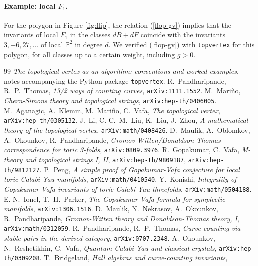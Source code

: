 \documentclass[11pt]{article}
\newcommand{\PP}{\mathbb{P}}
\newcommand{\topvertex}{\texttt{topvertex}}
\begin{document}
\paragraph{Example: local $F_1$.} For the polygon in Figure \ref{fig:flip}, the relation
(\ref{flop-gv}) implies that the invariants of local $F_1$ in the classes $dB+dF$ coincide with
the invariants $3,-6,27,\ldots$ of local $\PP^2$ in degree $d$. We verified (\ref{flop-gv}) with
\topvertex{} for this polygon, for all classes up to a certain weight, including $g>0$.

{\footnotesize
\begin{thebibliography}{99}\setlength{\itemsep}{-2pt}\setlength{\parsep}{0pt}
 \textit{The topological vertex as an algorithm: conventions and worked examples},
notes accompanying the Python package \texttt{topvertex}.
 R.~Pandharipande, R.~P.~Thomas, \textit{13/2 ways of counting curves},
\texttt{arXiv:1111.1552}.
 M.~Mari\~no, \textit{Chern-Simons theory and topological strings},
\texttt{arXiv:hep-th/0406005}.
 M.~Aganagic, A.~Klemm, M.~Mari\~no, C.~Vafa, \textit{The topological vertex},
\texttt{arXiv:hep-th/0305132}.
 J.~Li, C.-C.~M.~Liu, K.~Liu, J.~Zhou, \textit{A mathematical theory of the
topological vertex},
\texttt{arXiv:math/0408426}.
 D.~Maulik, A.~Oblomkov, A.~Okounkov, R.~Pandharipande,
\textit{Gromov-Witten/Donaldson-Thomas correspondence for toric 3-folds},
\texttt{arXiv:0809.3976}.
 R.~Gopakumar, C.~Vafa, \textit{M-theory and topological strings I, II},
\texttt{arXiv:hep-th/9809187}, \texttt{arXiv:hep-th/9812127}.
 P.~Peng, \textit{A simple proof of Gopakumar-Vafa conjecture for local toric
Calabi-Yau manifolds},
\texttt{arXiv:math/0410540}.
 Y.~Konishi, \textit{Integrality of Gopakumar-Vafa invariants of toric Calabi-Yau
threefolds},
\texttt{arXiv:math/0504188}.
 E.-N.~Ionel, T.~H.~Parker, \textit{The Gopakumar-Vafa formula for symplectic
manifolds},
\texttt{arXiv:1306.1516}.
 D.~Maulik, N.~Nekrasov, A.~Okounkov, R.~Pandharipande, \textit{Gromov-Witten theory
and Donaldson-Thomas theory, I},
\texttt{arXiv:math/0312059}.
 R.~Pandharipande, R.~P.~Thomas, \textit{Curve counting via stable pairs in the
derived category},
\texttt{arXiv:0707.2348}.
 A.~Okounkov, N.~Reshetikhin, C.~Vafa, \textit{Quantum Calabi-Yau and classical
crystals},
\texttt{arXiv:hep-th/0309208}.
 T.~Bridgeland, \textit{Hall algebras and curve-counting invariants},

\end{thebibliography}}
\end{document}
